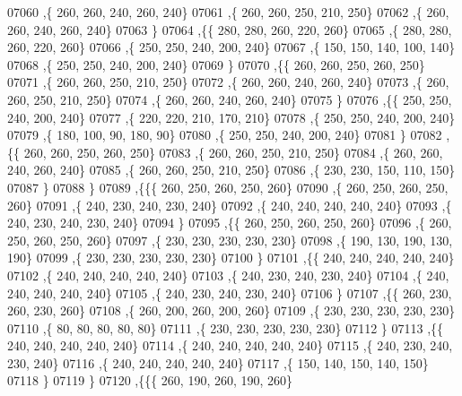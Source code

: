 \begin{DoxyCode}
07060     ,\{   260,   260,   240,   260,   240\}
07061     ,\{   260,   260,   250,   210,   250\}
07062     ,\{   260,   260,   240,   260,   240\}
07063     \}
07064    ,\{\{   280,   280,   260,   220,   260\}
07065     ,\{   280,   280,   260,   220,   260\}
07066     ,\{   250,   250,   240,   200,   240\}
07067     ,\{   150,   150,   140,   100,   140\}
07068     ,\{   250,   250,   240,   200,   240\}
07069     \}
07070    ,\{\{   260,   260,   250,   260,   250\}
07071     ,\{   260,   260,   250,   210,   250\}
07072     ,\{   260,   260,   240,   260,   240\}
07073     ,\{   260,   260,   250,   210,   250\}
07074     ,\{   260,   260,   240,   260,   240\}
07075     \}
07076    ,\{\{   250,   250,   240,   200,   240\}
07077     ,\{   220,   220,   210,   170,   210\}
07078     ,\{   250,   250,   240,   200,   240\}
07079     ,\{   180,   100,    90,   180,    90\}
07080     ,\{   250,   250,   240,   200,   240\}
07081     \}
07082    ,\{\{   260,   260,   250,   260,   250\}
07083     ,\{   260,   260,   250,   210,   250\}
07084     ,\{   260,   260,   240,   260,   240\}
07085     ,\{   260,   260,   250,   210,   250\}
07086     ,\{   230,   230,   150,   110,   150\}
07087     \}
07088    \}
07089   ,\{\{\{   260,   250,   260,   250,   260\}
07090     ,\{   260,   250,   260,   250,   260\}
07091     ,\{   240,   230,   240,   230,   240\}
07092     ,\{   240,   240,   240,   240,   240\}
07093     ,\{   240,   230,   240,   230,   240\}
07094     \}
07095    ,\{\{   260,   250,   260,   250,   260\}
07096     ,\{   260,   250,   260,   250,   260\}
07097     ,\{   230,   230,   230,   230,   230\}
07098     ,\{   190,   130,   190,   130,   190\}
07099     ,\{   230,   230,   230,   230,   230\}
07100     \}
07101    ,\{\{   240,   240,   240,   240,   240\}
07102     ,\{   240,   240,   240,   240,   240\}
07103     ,\{   240,   230,   240,   230,   240\}
07104     ,\{   240,   240,   240,   240,   240\}
07105     ,\{   240,   230,   240,   230,   240\}
07106     \}
07107    ,\{\{   260,   230,   260,   230,   260\}
07108     ,\{   260,   200,   260,   200,   260\}
07109     ,\{   230,   230,   230,   230,   230\}
07110     ,\{    80,    80,    80,    80,    80\}
07111     ,\{   230,   230,   230,   230,   230\}
07112     \}
07113    ,\{\{   240,   240,   240,   240,   240\}
07114     ,\{   240,   240,   240,   240,   240\}
07115     ,\{   240,   230,   240,   230,   240\}
07116     ,\{   240,   240,   240,   240,   240\}
07117     ,\{   150,   140,   150,   140,   150\}
07118     \}
07119    \}
07120   ,\{\{\{   260,   190,   260,   190,   260\}

\end{DoxyCode}
